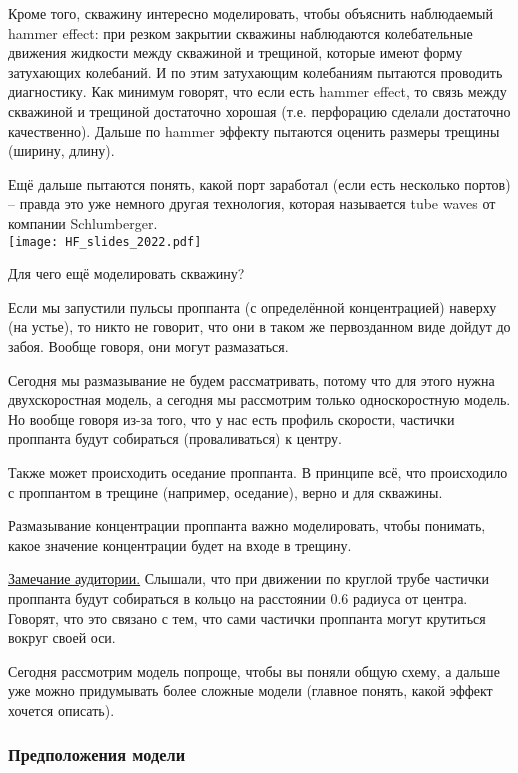 \documentclass[main.tex]{subfiles}
\begin{document}
Кроме того, скважину интересно моделировать, чтобы объяснить наблюдаемый hammer effect: при резком закрытии скважины наблюдаются колебательные движения жидкости между скважиной и трещиной, которые имеют форму затухающих колебаний.
И по этим затухающим колебаниям пытаются проводить диагностику. Как минимум говорят, что если есть hammer effect, то связь между скважиной и трещиной достаточно хорошая (т.е. перфорацию сделали достаточно качественно).
Дальше по hammer эффекту пытаются оценить размеры трещины (ширину, длину).

Ещё дальше пытаются понять, какой порт заработал (если есть несколько портов) -- правда это уже немного другая технология, которая называется tube waves от компании Schlumberger.
\\

\texttt{[image: HF\_slides\_2022.pdf]}

Для чего ещё моделировать скважину?

Если мы запустили пульсы проппанта (с определённой концентрацией) наверху (на устье), то никто не говорит, что они в таком же первозданном виде дойдут до забоя.
Вообще говоря, они могут размазаться.

Сегодня мы размазывание не будем рассматривать, потому что для этого нужна двухскоростная модель, а сегодня мы рассмотрим только односкоростную модель.
Но вообще говоря из-за того, что у нас есть профиль скорости, частички проппанта будут собираться (проваливаться) к центру.

Также может происходить оседание проппанта.
В принципе всё, что происходило с проппантом в трещине (например, оседание), верно и для скважины.
 
Размазывание концентрации проппанта важно моделировать, чтобы понимать, какое значение концентрации будет на входе в трещину.

\underline{Замечание аудитории.}
Слышали, что при движении по круглой трубе частички проппанта будут собираться в кольцо на расстоянии 0.6 радиуса от центра.
Говорят, что это связано с тем, что сами частички проппанта могут крутиться вокруг своей оси.


Сегодня рассмотрим модель попроще, чтобы вы поняли общую схему, а дальше уже можно придумывать более сложные модели (главное понять, какой эффект хочется описать).
\\

\subsubsection{Предположения модели}
\end{document}
